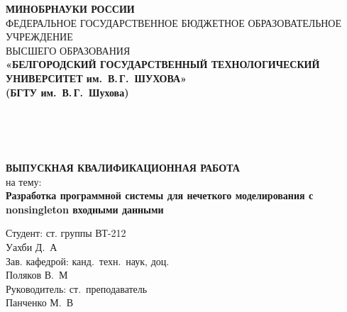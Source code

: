 
\begin{center}
	\textbf{МИНОБРНАУКИ РОССИИ}\\[0.5em]
	\vspace{0.2em}
	{\scriptsize ФЕДЕРАЛЬНОЕ ГОСУДАРСТВЕННОЕ БЮДЖЕТНОЕ ОБРАЗОВАТЕЛЬНОЕ УЧРЕЖДЕНИЕ\\[-0.5em]
		ВЫСШЕГО ОБРАЗОВАНИЯ}\\[0.5em]
	{\small \textbf{«БЕЛГОРОДСКИЙ ГОСУДАРСТВЕННЫЙ ТЕХНОЛОГИЧЕСКИЙ\\
		УНИВЕРСИТЕТ им.\ В.\,Г.\ ШУХОВА»\\[-0.3em]
		(БГТУ им.\ В.\,Г.\ Шухова)}}
\end{center}

\vspace{1em}

\begin{flushleft}
	{\footnotesize                           %
		\\
		\\
		\\
	}
\end{flushleft}

\vspace{1em}

\begin{center}
	\textbf{ВЫПУСКНАЯ КВАЛИФИКАЦИОННАЯ РАБОТА}\\[0.1em]
	на тему:\\[0.5em]
	\textbf{Разработка программной системы для нечеткого моделирования с non\-singleton входными данными}
\end{center}

\vspace{1em}

\begin{flushright}
	\small
	\begin{minipage}{7cm}
		Студент: ст. группы ВТ-212 \\ Уахби Д.\ А\\
		Зав. кафедрой: канд.\ техн.\ наук, доц.\ \\ Поляков В.\ М\\
		Руководитель: ст.\ преподаватель \\ Панченко М.\ В
	\end{minipage}
\end{flushright}

